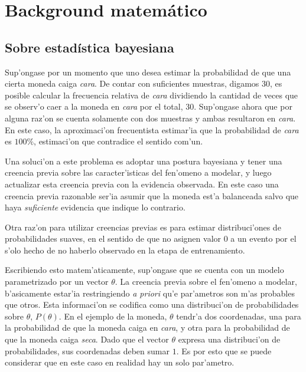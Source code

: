 \section{Background matem\'atico}
\label{sec:math_bg}
\subsection{Sobre estad\'istica bayesiana}

Sup'ongase por un momento que uno desea estimar la probabilidad de que una cierta moneda caiga \emph{cara}. De contar con suficientes muestras, digamos 30, 
es posible calcular la frecuencia relativa de \emph{cara} dividiendo la cantidad de veces que se observ'o caer a la moneda en \emph{cara} por el total, 30. 
Sup'ongase ahora que por alguna raz'on se cuenta solamente con dos muestras y ambas resultaron en \emph{cara}. En este caso, la aproximaci'on frecuentista
estimar'ia que la probabilidad de \emph{cara} es $100\%$, estimaci'on que contradice el sentido com'un. 

Una soluci'on a este problema es adoptar una postura bayesiana y tener una creencia previa sobre las caracter'isticas del fen'omeno a modelar, 
y luego actualizar esta creencia previa con la evidencia observada. En este caso una creencia previa razonable ser'ia asumir que la moneda est'a balanceada
salvo que haya \emph{suficiente} evidencia que indique lo contrario. %

Otra raz'on para utilizar creencias previas es para estimar distribuci'ones de probabilidades suaves, en el sentido de que no asignen valor $0$ a un evento 
por el s'olo hecho de no haberlo observado en la etapa de entrenamiento. 

Escribiendo esto matem'aticamente, sup'ongase que se cuenta con un mo\-delo parametrizado por un vector $\theta$. La creencia previa sobre el fen'omeno a modelar, b'asicamente estar'ia restringiendo \emph{a priori} qu'e par'ametros son m'as probables que otros. 
Esta informaci'on se codifica como una distribuci'on de probabilidades sobre $\theta$, $P(\theta)$. En el ejemplo de la moneda, $\theta$ 
tendr'a dos coordenadas, una para la probabilidad de que la moneda caiga en \emph{cara}, y otra para la probabilidad de que la moneda caiga \emph{seca}.
Dado que el vector $\theta$ expresa una distribuci'on de probabilidades, sus coordenadas deben sumar $1$. Es por esto que se puede considerar que en este caso en realidad hay un solo par'ametro.

